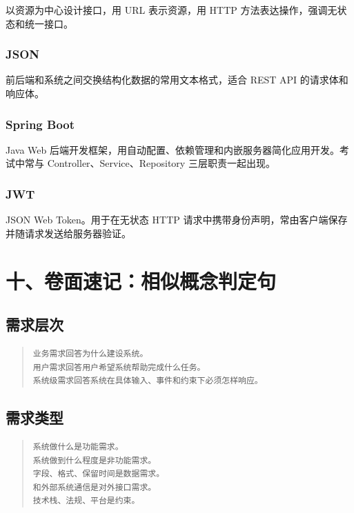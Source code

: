 \documentclass[UTF8,zihao=-4]{ctexart}
\begin{document}
以资源为中心设计接口，用 URL 表示资源，用 HTTP 方法表达操作，强调无状态和统一接口。


\subsubsection*{JSON}


前后端和系统之间交换结构化数据的常用文本格式，适合 REST API 的请求体和响应体。


\subsubsection*{Spring Boot}


Java Web 后端开发框架，用自动配置、依赖管理和内嵌服务器简化应用开发。考试中常与 Controller、Service、Repository 三层职责一起出现。


\subsubsection*{JWT}


JSON Web Token。用于在无状态 HTTP 请求中携带身份声明，常由客户端保存并随请求发送给服务器验证。


\section{十、卷面速记：相似概念判定句}


\subsection{需求层次}


\begin{quote}
\footnotesize
\begin{verbatim}
业务需求回答为什么建设系统。
用户需求回答用户希望系统帮助完成什么任务。
系统级需求回答系统在具体输入、事件和约束下必须怎样响应。
\end{verbatim}
\end{quote}


\subsection{需求类型}


\begin{quote}
\footnotesize
\begin{verbatim}
系统做什么是功能需求。
系统做到什么程度是非功能需求。
字段、格式、保留时间是数据需求。
和外部系统通信是对外接口需求。
技术栈、法规、平台是约束。
\end{verbatim}
\end{quote}
\end{document}
